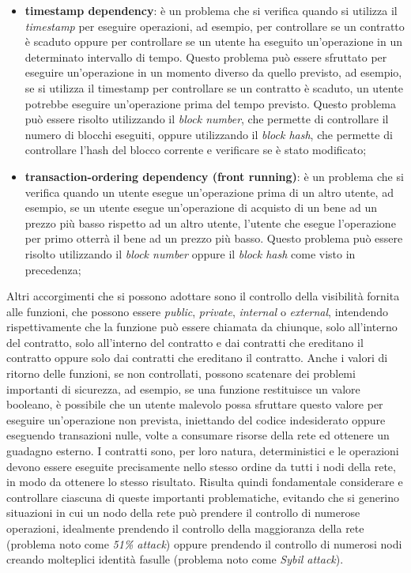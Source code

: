\begin{itemize}
    \item \textbf{timestamp dependency}: è un problema che si verifica quando si utilizza il \textit{timestamp} per eseguire operazioni, ad esempio, per controllare se un contratto è scaduto oppure per controllare se un utente ha eseguito
    un'operazione in un determinato intervallo di tempo. Questo problema può essere sfruttato per eseguire un'operazione in un momento diverso da quello previsto, ad esempio, se si utilizza il timestamp per controllare se un contratto
    è scaduto, un utente potrebbe eseguire un'operazione prima del tempo previsto. Questo problema può essere risolto utilizzando il \textit{block number}, che permette di controllare il numero di blocchi eseguiti, oppure utilizzando
    il \textit{block hash}, che permette di controllare l'hash del blocco corrente e verificare se è stato modificato;
    \item \textbf{transaction-ordering dependency (front running)}: è un problema che si verifica quando un utente esegue un'operazione prima di un altro utente, ad esempio, se un utente esegue un'operazione di acquisto di un bene
    ad un prezzo più basso rispetto ad un altro utente, l'utente che esegue l'operazione per primo otterrà il bene ad un prezzo più basso. Questo problema può essere risolto utilizzando il \textit{block number} oppure il \textit{block hash}
    come visto in precedenza;
\end{itemize}

Altri accorgimenti che si possono adottare sono il controllo della visibilità fornita alle funzioni, che possono essere \textit{public}, \textit{private}, \textit{internal} o \textit{external},
intendendo rispettivamente che la funzione può essere chiamata da chiunque, solo all'interno del contratto, solo all'interno del contratto e dai contratti che ereditano il contratto oppure solo dai contratti che ereditano il contratto.
Anche i valori di ritorno delle funzioni, se non controllati, possono scatenare dei problemi importanti di sicurezza, ad esempio, se una funzione restituisce un valore booleano, è possibile che un utente malevolo possa
sfruttare questo valore per eseguire un'operazione non prevista, iniettando del codice indesiderato oppure eseguendo transazioni nulle, volte a consumare risorse della rete ed ottenere un guadagno esterno.
I contratti sono, per loro natura, deterministici e le operazioni devono essere eseguite precisamente nello stesso ordine da tutti i nodi della rete, in modo da ottenere lo stesso risultato.
Risulta quindi fondamentale considerare e controllare ciascuna di queste importanti problematiche, evitando che si generino situazioni in cui un nodo della rete può prendere il controllo di numerose operazioni,
idealmente prendendo il controllo della maggioranza della rete (problema noto come \textit{51\% attack}) oppure prendendo il controllo di numerosi nodi creando molteplici identità fasulle (problema noto come \textit{Sybil attack}).

